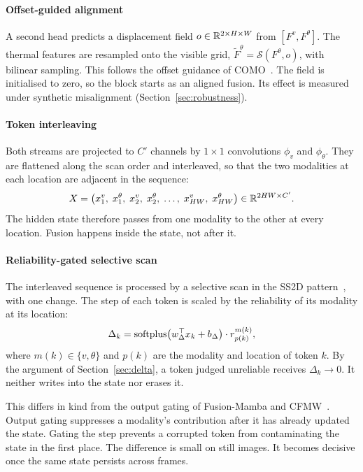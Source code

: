 \paragraph{Offset-guided alignment}
A second head predicts a displacement field $o \in \mathbb{R}^{2\times H\times W}$ from
$[F^v, F^\theta]$. The thermal features are resampled onto the visible grid,
$\tilde F^\theta = \mathcal{S}(F^\theta, o)$, with bilinear sampling. This follows
the offset guidance of COMO~\citep{como2024}. The field is initialised to
zero, so the block starts as an aligned fusion. Its effect is measured under
synthetic misalignment (Section~\ref{sec:robustness}).

\paragraph{Token interleaving}
Both streams are projected to $C'$ channels by $1\times1$ convolutions
$\phi_v$ and $\phi_\theta$. They are flattened along the scan order and
interleaved, so that the two modalities at each location are adjacent in
the sequence:
\begin{equation}
  X = \bigl(x^v_1,\; x^\theta_1,\; x^v_2,\; x^\theta_2,\; \dots,\; x^v_{HW},\; x^\theta_{HW}\bigr)
  \in \mathbb{R}^{2HW \times C'} .
  \label{eq:interleave}
\end{equation}
The hidden state therefore passes from one modality to the other at every
location. Fusion happens inside the state, not after it.

\paragraph{Reliability-gated selective scan}
The interleaved sequence is processed by a selective scan in the SS2D
pattern~\citep{liu2024vmamba}, with one change. The step of each token is
scaled by the reliability of its modality at its location:
\begin{equation}
  \Delta_k = \operatorname{softplus}\bigl(w_\Delta^{\top} x_k + b_\Delta\bigr)\cdot r^{m(k)}_{p(k)},
  \label{eq:gated-delta}
\end{equation}
where $m(k)\in\{v,\theta\}$ and $p(k)$ are the modality and location of token
$k$. By the argument of Section~\ref{sec:delta}, a token judged unreliable
receives $\Delta_k\to0$. It neither writes into the state nor erases it.

This differs in kind from the output gating of
Fusion-Mamba and CFMW~\citep{dong2025fusionmamba,li2025cfmw}. Output gating
suppresses a modality's contribution after it has already updated the state.
Gating the step prevents a corrupted token from contaminating the state in
the first place. The difference is small on still images. It becomes
decisive once the same state persists across frames.

